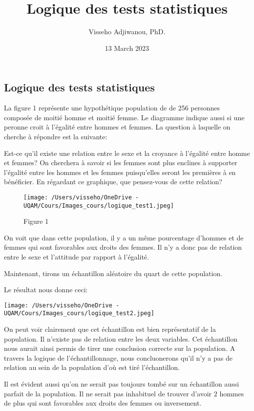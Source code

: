 \documentclass[
]{article}
\title{Logique des tests statistiques}
\author{Visseho Adjiwanou, PhD.}
\date{13 March 2023}
\begin{document}
\maketitle

\hypertarget{logique-des-tests-statistiques}{%
\subsection{Logique des tests
statistiques}\label{logique-des-tests-statistiques}}

La figure 1 représente une hypothétique population de de 256 personnes
composée de moitié homme et moitié femme. Le diagramme indique aussi si
une peronne croit à l'égalité entre hommes et femmes. La question à
laquelle on cherche à répondre est la suivante:

Est-ce qu'il existe une relation entre le sexe et la croyance à
l'égalité entre homme et femmes? On cherchera à savoir si les femmes
sont plus enclines à supporter l'égalité entre les hommes et les femmes
puisqu'elles seront les premières à en bénéficier. En régardant ce
graphique, que pensez-vous de cette relation?

\begin{figure}
\centering
\texttt{[image: /Users/visseho/OneDrive - UQAM/Cours/Images\_cours/logique\_test1.jpeg]}
\caption{Figure 1}
\end{figure}

On voit que dans cette population, il y a un même pourcentage d'hommes
et de femmes qui sont favorables aux droits des femmes. Il n'y a donc
pas de relation entre le sexe et l'attitude par rapport à l'égalité.

Maintenant, tirons un échantillon aléatoire du quart de cette
population.

Le résultat nous donne ceci:

\texttt{[image: /Users/visseho/OneDrive - UQAM/Cours/Images\_cours/logique\_test2.jpeg]}

On peut voir clairement que cet échantillon est bien représentatif de la
population. Il n'existe pas de relation entre les deux variables. Cet
échantillon nous aurait ainsi permis de tirer une conclusion correcte
sur la population. A travers la logique de l'échantillonnage, nous
concluonerons qu'il n'y a pas de relation au sein de la population d'où
est tiré l'échantillon.

Il est évident aussi qu'on ne serait pas toujours tombé sur un
échantillon aussi parfait de la population. Il ne serait pas inhabituel
de trouver d'avoir 2 hommes de plus qui sont favorables aux droits des
femmes ou inversement.
\end{document}
